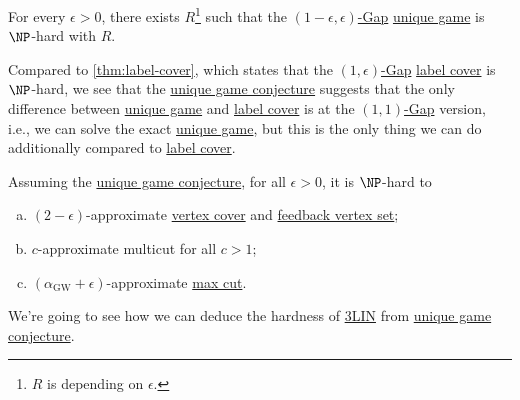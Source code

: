 \begin{conjecture}\label{conj:unique-game}
	For every \(\epsilon > 0\), there exists \(R\)\footnote{\(R\) is depending on \(\epsilon \).} such that the \hyperref[def:c-s-Gap]{\((1-\epsilon , \epsilon )\)-Gap} \hyperref[prb:unique-game]{unique game} is \(\NP\)-hard with \(R\).
\end{conjecture}

Compared to \autoref{thm:label-cover}, which states that the \hyperref[def:c-s-Gap]{\((1, \epsilon )\)-Gap} \hyperref[prb:label-cover]{label cover} is \(\NP\)-hard, we see that the \hyperref[conj:unique-game]{unique game conjecture} suggests that the only difference between \hyperref[prb:unique-game]{unique game} and \hyperref[prb:label-cover]{label cover} is at the \hyperref[def:c-s-Gap]{\((1, 1)\)-Gap} version, i.e., we can solve the exact \hyperref[prb:unique-game]{unique game}, but this is the only thing we can do additionally compared to \hyperref[prb:label-cover]{label cover}.

\begin{remark}
	Assuming the \hyperref[conj:unique-game]{unique game conjecture}, for all \(\epsilon > 0\), it is \(\NP\)-hard to
	\begin{enumerate}[(a)]
		\item \((2-\epsilon )\)-approximate \hyperref[prb:vertex-cover]{vertex cover} and \hyperref[prb:feedback-vertex-set]{feedback vertex set};
		\item \(c\)-approximate multicut for all \(c > 1\);
		\item \((\alpha _{\mathrm{GW} } + \epsilon )\)-approximate \hyperref[prb:max-cut]{max cut}.
	\end{enumerate}
\end{remark}

We're going to see how we can deduce the hardness of \hyperref[prb:max-3LIN]{3LIN} from \hyperref[conj:unique-game]{unique game conjecture}.